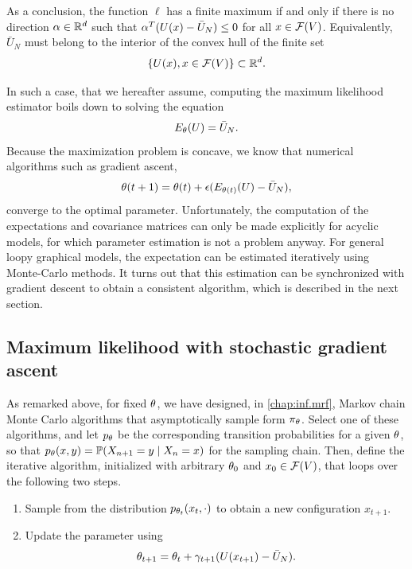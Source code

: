As a conclusion, the function $\ell$ has a finite maximum if and only
if there is no direction $\alpha\in {\mathbb{R}}^d$ such that $\alpha^T(U(x) -
\bar U_N) \leq 0$ for all $x\in {\mathcal F}(V)$. Equivalently, $\bar U_N$ must
belong to the interior of the convex hull of the finite set
$$
\left\{ U(x), x\in {\mathcal F}(V) \right\}\subset {\mathbb{R}}^d.
$$

In such a case, that we hereafter assume, computing the maximum likelihood estimator boils down to
solving the equation
$$
E_\theta (U) = \bar U_N.
$$
Because the maximization problem is concave, we know that numerical
algorithms such as gradient ascent, 
\begin{equation}
\label{eq:grd.des}
\theta(t+1) = \theta(t) + \epsilon (E_{\theta(t)} (U) - \bar U_N),
\end{equation}
converge to the optimal parameter. Unfortunately, the computation of
the expectations and covariance matrices can only be made explicitly
for acyclic models, for which parameter estimation is not a problem
anyway. For general loopy graphical models, the expectation can be
estimated iteratively using Monte-Carlo methods. It turns out that
this estimation can be synchronized with gradient descent to obtain a
consistent algorithm, which is described in the next section.

\subsection{Maximum likelihood with stochastic gradient ascent}
\label{sec:stoc.grad}

As remarked above, for fixed $\theta$, we have designed, in \cref{chap:inf.mrf}, Markov chain Monte
Carlo algorithms that asymptotically sample form $\pi_\theta$. Select one
of these algorithms, and let $ p_\theta$ be the corresponding
 transition probabilities for a given $\theta$, so that $p_\theta(x,y) = \bm{\mathbb P}(X_{n+1} = y \mid X_n=x)$ for the sampling chain. Then, define the iterative
algorithm, initialized with arbitrary $\theta_0$ and $x_0 \in {\mathcal F}(V)$,
that loops over the following two steps.
\begin{enumerate}[label=(SG\arabic*)]
\item Sample from the distribution $ p_{\theta_t}(x_t,
\cdot)$ to obtain a new configuration $x_{t+1}$.
\item Update the parameter using
\begin{equation}
\label{eq:stoc.grad}
\theta_{t+1} = \theta_t + \gamma_{t+1} (U(x_{t+1}) - \bar U_N).
\end{equation}
\end{enumerate}

